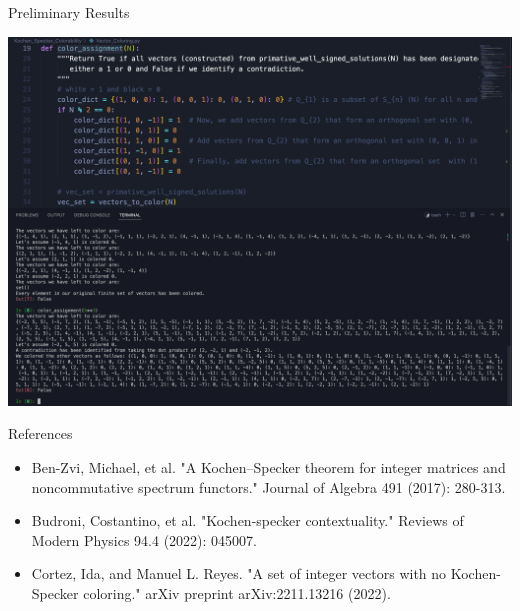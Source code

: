 \documentclass[11pt]{beamer}
\begin{document}
\begin{frame}{Preliminary Results}

\centering

\includegraphics[width=\textwidth]{Results 3}

\end{frame}
\begin{frame}{References}

\begin{itemize}
\item Ben-Zvi, Michael, et al. "A Kochen–Specker theorem for integer matrices and noncommutative spectrum functors." Journal of Algebra 491 (2017): 280-313.

\item Budroni, Costantino, et al. "Kochen-specker contextuality." Reviews of Modern Physics 94.4 (2022): 045007.

\item Cortez, Ida, and Manuel L. Reyes. "A set of integer vectors with no Kochen-Specker coloring." arXiv preprint arXiv:2211.13216 (2022).
\end{itemize}

\end{frame}

\end{document}
